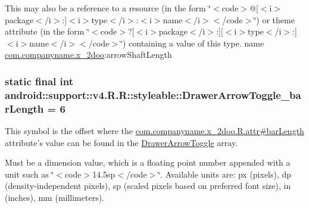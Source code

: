 This may also be a reference to a resource (in the form \char`\"{}$<$code$>$@\mbox{[}$<$i$>$package$<$/i$>$:\mbox{]}$<$i$>$type$<$/i$>$:$<$i$>$name$<$/i$>$$<$/code$>$\char`\"{}) or theme attribute (in the form \char`\"{}$<$code$>$?\mbox{[}$<$i$>$package$<$/i$>$:\mbox{]}\mbox{[}$<$i$>$type$<$/i$>$:\mbox{]}$<$i$>$name$<$/i$>$$<$/code$>$\char`\"{}) containing a value of this type.  name \hyperlink{namespacecom_1_1companyname_1_1x__2doo}{com.companyname.x\_\-2doo}:arrowShaftLength \hypertarget{classandroid_1_1support_1_1v4_1_1_r_1_1styleable_0e89f15d919cd6100bf02a0769720644}{
\subsubsection[{DrawerArrowToggle\_\-barLength}]{\setlength{\rightskip}{0pt plus 5cm}static final int android::support::v4.R.R::styleable::DrawerArrowToggle\_\-barLength = 6}}
\label{classandroid_1_1support_1_1v4_1_1_r_1_1styleable_0e89f15d919cd6100bf02a0769720644}


This symbol is the offset where the \hyperlink{classcom_1_1companyname_1_1x__2doo_1_1_r_1_1attr_6c62900ec8d117b9e103e454ed07d741}{com.companyname.x\_\-2doo.R.attr\#barLength} attribute's value can be found in the \hyperlink{classandroid_1_1support_1_1v4_1_1_r_1_1styleable_df2952a999161d3c408fb6267800afe6}{DrawerArrowToggle} array.

Must be a dimension value, which is a floating point number appended with a unit such as \char`\"{}$<$code$>$14.5sp$<$/code$>$\char`\"{}. Available units are: px (pixels), dp (density-independent pixels), sp (scaled pixels based on preferred font size), in (inches), mm (millimeters). 

